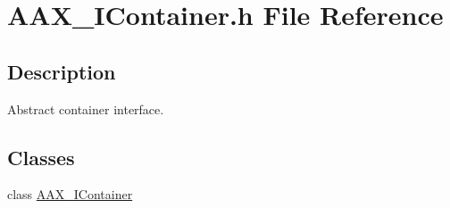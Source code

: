 \hypertarget{a00238}{}\section{A\+A\+X\+\_\+\+I\+Container.\+h File Reference}
\label{a00238}


\subsection{Description}
Abstract container interface. 

\subsection*{Classes}
\begin{DoxyCompactItemize}
\item 
class \hyperlink{a00089}{A\+A\+X\+\_\+\+I\+Container}
\end{DoxyCompactItemize}
